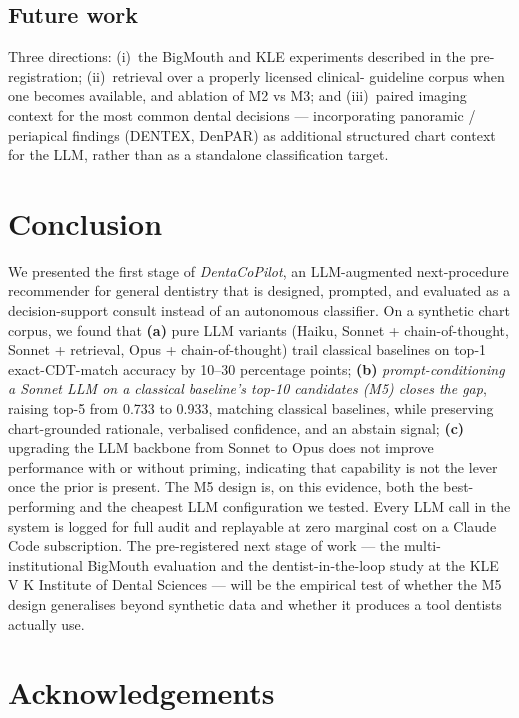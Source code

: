 \documentclass[preprint,authoryear,1p,12pt]{elsarticle}
\begin{document}
\subsection{Future work}

Three directions: (i)~the BigMouth and KLE experiments described in the
pre-registration; (ii)~retrieval over a properly licensed clinical-
guideline corpus when one becomes available, and ablation of M2 vs M3;
and (iii)~paired imaging context for the most common dental decisions ---
incorporating panoramic / periapical findings (DENTEX, DenPAR) as
additional structured chart context for the LLM, rather than as a
standalone classification target.

\section{Conclusion}
\label{sec:conclusion}

We presented the first stage of \emph{DentaCoPilot}, an LLM-augmented
next-procedure recommender for general dentistry that is designed,
prompted, and evaluated as a decision-support consult instead of an
autonomous classifier. On a synthetic chart corpus, we found that
\textbf{(a)} pure LLM variants (Haiku, Sonnet + chain-of-thought,
Sonnet + retrieval, Opus + chain-of-thought) trail classical baselines
on top-1 exact-CDT-match accuracy by 10--30 percentage points;
\textbf{(b)} \emph{prompt-conditioning a Sonnet LLM on a classical
baseline's top-10 candidates (M5) closes the gap}, raising top-5 from
0.733 to 0.933, matching classical baselines, while preserving
chart-grounded rationale, verbalised confidence, and an abstain
signal; \textbf{(c)} upgrading the LLM backbone from Sonnet to Opus
does not improve performance with or without priming, indicating that
capability is not the lever once the prior is present. The M5 design
is, on this evidence, both the best-performing and the cheapest LLM
configuration we tested. Every LLM call in the system is logged for
full audit and replayable at zero marginal cost on a Claude Code
subscription. The pre-registered next stage of work --- the
multi-institutional BigMouth evaluation and the dentist-in-the-loop
study at the KLE V K Institute of Dental Sciences --- will be the
empirical test of whether the M5 design generalises beyond synthetic
data and whether it produces a tool dentists actually use.

\section*{Acknowledgements}
\end{document}
